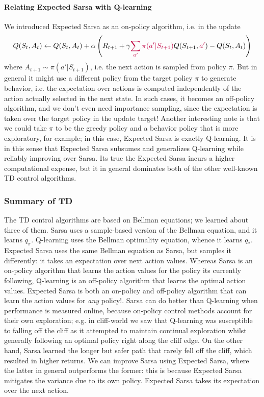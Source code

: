 \documentclass[12pt]{article}
\begin{document}
\paragraph{Relating Expected Sarsa with Q-learning} We introduced Expected Sarsa as an on-policy algorithm, i.e. in the update
\[
  Q(S_t, A_t) \gets Q(S_t, A_t) + \alpha \left(R_{t+1} + \gamma {\color{purple} \sum_{a'} \pi(a'|S_{t+1})} Q(S_{t+1}, {\color{purple}a'}) - Q(S_t, A_t)\right)
\]
where $A_{t+1} \sim \pi(a' | S_{t+1})$, i.e. the next action is sampled from policy $\pi$. But in general it might use a different policy from the target policy $\pi$ to generate behavior, i.e. the expectation over actions is computed independently of the action actually selected in the next state. In such cases, it becomes an off-policy algorithm, and we don't even need importance sampling, since the expectation is taken over the target policy in the update target! Another interesting note is that we could take $\pi$ to be the greedy policy and a behavior policy that is more exploratory, for example; in this case, Expected Sarsa is exactly Q-learning. It is in this sense that Expected Sarsa subsumes and generalizes Q-learning while reliably improving over Sarsa. Its true the Expected Sarsa incurs a higher computational expense, but it in general dominates both of the other well-known TD control algorithms.

\subsubsection{Summary of TD}
The TD control algorithms are based on Bellman equations; we learned about three of them. Sarsa uses a sample-based version of the Bellman equation, and it learns $q_\pi$. Q-learning uses the Bellman optimality equation, whence it learns $q_*$. Expected Sarsa uses the same Bellman equation as Sarsa, but samples it differently: it takes an expectation over next action values. Whereas Sarsa is an on-policy algorithm that learns the action values for the policy its currently following, Q-learning is an off-policy algorithm that learns the optimal action values. Expected Sarsa is both an on-policy and off-policy algorithm that can learn the action values for \emph{any} policy!. Sarsa can do better than Q-learning when performance is measured online, because on-policy control methods account for their own exploration; e.g. in cliff-world we saw that Q-learning was susceptible to falling off the cliff as it attempted to maintain continual exploration whilst generally following an optimal policy right along the cliff edge. On the other hand, Sarsa learned the longer but safer path that rarely fell off the cliff, which resulted in higher returns. We can improve Sarsa using Expected Sarsa, where the latter in general outperforms the former: this is because Expected Sarsa mitigates the variance due to its own policy. Expected Sarsa takes its expectation over the next action. 
\end{document}
